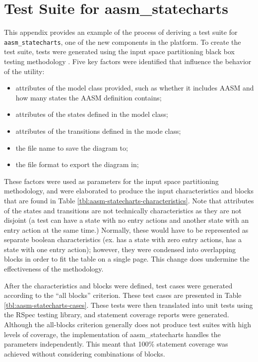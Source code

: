\documentclass[document.tex]{subfiles}
\begin{document}
\chapter{Test Suite for aasm\_statecharts}
\label {ch:aasm-statecharts-test-cases}

\vspace{-\baselineskip}

This appendix provides an example of the process of deriving a test suite for \verb!aasm_statecharts!, one of the new components in the platform.
To create the test suite, tests were generated using the input space partitioning black box testing methodology \cite{offut}. Five key factors were identified that influence the behavior of the utility:

\begin{itemize}
\item attributes of the model class provided, such as whether it includes AASM and how many states the AASM definition contains;
\item attributes of the states defined in the model class;
\item attributes of the transitions defined in the mode class;
\item the file name to save the diagram to;
\item the file format to export the diagram in;
\end{itemize}

These factors were used as parameters for the input space partitioning methodology, and were elaborated to produce the input characteristics and blocks that are found in Table \ref{tbl:aasm-statecharts-characteristics}. Note that attributes of the states and transitions are not technically characteristics as they are not disjoint (a test can have a state with no entry actions and another state with an entry action at the same time.) Normally, these would have to be represented as separate boolean characteristics (ex. has a state with zero entry actions, has a state with one entry action); however, they were condensed into overlapping blocks in order to fit the table on a single page. This change does undermine the effectiveness of the methodology.

After the characteristics and blocks were defined, test cases were generated according to the ``all blocks'' criterion. These test cases are presented in Table \ref{tbl:aasm-statecharts-cases}. These tests were then translated into unit tests using the RSpec \cite{rspec} testing library, and statement coverage reports were generated. Although the all-blocks criterion generally does not produce test suites with high levels of coverage, the implementation of aasm\_statecharts handles the parameters independently. This meant that 100\% statement coverage was achieved without considering combinations of blocks.
\end{document}
